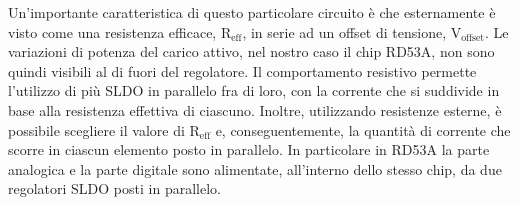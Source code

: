 Un'importante caratteristica di questo particolare circuito è che esternamente è visto come una resistenza efficace, $\mathrm{R_{eff}}$, in serie ad un offset di tensione, $\mathrm{V_{offset}}$.
Le variazioni di potenza del carico attivo, nel nostro caso il chip RD53A, non sono quindi visibili al di fuori del regolatore.
Il comportamento resistivo permette l'utilizzo di più SLDO in parallelo fra di loro, con la corrente che si suddivide in base alla resistenza effettiva di ciascuno.
Inoltre, utilizzando resistenze esterne, è possibile scegliere il valore di $\mathrm{R_{eff}}$ e, conseguentemente, la quantità di corrente che scorre in ciascun elemento posto in parallelo.
In particolare in RD53A la parte analogica e la parte digitale sono alimentate, all'interno dello stesso chip, da due regolatori SLDO posti in parallelo.

